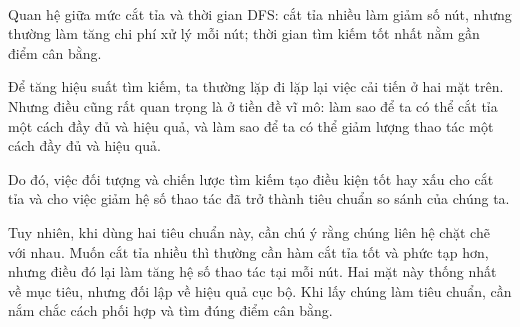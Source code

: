 \documentclass[11pt]{article}
\begin{document}
\begin{center}
\\
\small Quan hệ giữa mức cắt tỉa và thời gian DFS: cắt tỉa nhiều làm giảm số
nút, nhưng thường làm tăng chi phí xử lý mỗi nút; thời gian tìm kiếm tốt nhất
nằm gần điểm cân bằng.
\end{center}

Để tăng hiệu suất tìm kiếm, ta thường lặp đi lặp lại việc cải tiến ở hai mặt
trên. Nhưng điều cũng rất quan trọng là ở tiền đề vĩ mô: làm sao để ta có thể
cắt tỉa một cách đầy đủ và hiệu quả, và làm sao để ta có thể giảm lượng thao
tác một cách đầy đủ và hiệu quả.

Do đó, việc đối tượng và chiến lược tìm kiếm tạo điều kiện tốt hay xấu cho cắt
tỉa và cho việc giảm hệ số thao tác đã trở thành tiêu chuẩn so sánh của chúng
ta.

Tuy nhiên, khi dùng hai tiêu chuẩn này, cần chú ý rằng chúng liên hệ chặt chẽ
với nhau. Muốn cắt tỉa nhiều thì thường cần hàm cắt tỉa tốt và phức tạp hơn,
nhưng điều đó lại làm tăng hệ số thao tác tại mỗi nút. Hai mặt này thống nhất
về mục tiêu, nhưng đối lập về hiệu quả cục bộ. Khi lấy chúng làm tiêu chuẩn,
cần nắm chắc cách phối hợp và tìm đúng điểm cân bằng.
\end{document}
